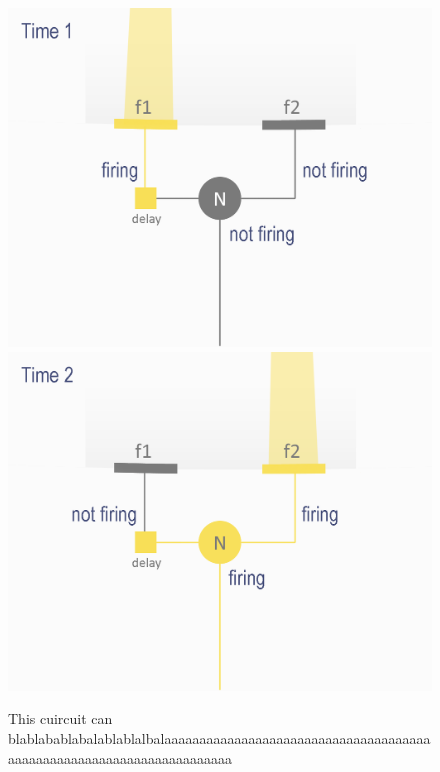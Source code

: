 \documentclass[11pt,a4paper,oneside,table,xcdraw]{article}
\begin{document}
\begin{figure}[H]
\begin{multicols}{2}
\includegraphics[width=1\linewidth]{figure/model3.png}
\columnbreak
\includegraphics[width=1\linewidth]{figure/model4.png}
\end{multicols}
\label{fig:delay}
\caption{This cuircuit can blablabablabalablablalbalaaaaaaaaaaaaaaaaaaaaaaaaaaaaaaaaaaaaaaaaaaaaaaaaaaaaaaaaaaaaaaaaaaaaaa}
\end{figure}
\end{document}

